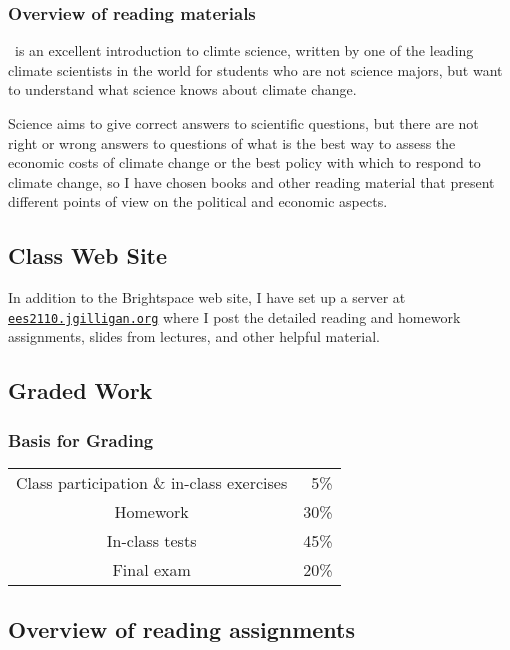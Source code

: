 \documentclass[11pt]{jgsyllabus}\usepackage[]{graphicx}\usepackage[]{xcolor}
\begin{document}
\subsubsection{Overview of reading materials}
\MedArcher\ is an excellent introduction to
climte science, written by one of the leading climate scientists in the world
for students who are not science majors, but want to understand what science
knows about climate change.

Science aims to give correct answers to scientific questions, but there are
not right or wrong answers to questions of what is the best way to
assess the economic costs of climate change or the best policy with which to
respond to climate change, so I have chosen books and other reading material
that present different points of view on the political and economic aspects.

\subsection{Class Web Site}

In addition to the Brightspace web site, I have set up a server at
\href{https://ees2110.jgilligan.org}{\nolinkurl{ees2110.jgilligan.org}}
where I post the detailed reading and homework assignments,
slides from lectures, and other helpful material.


\subsection{Graded Work}
%
%
%
\subsubsection[Grading]{Basis for Grading}

\begin{center}
	\begin{tabular}[t]{cr}
		Class participation \& in-class exercises & 5\%\\
		Homework & 30\%\\
		In-class tests & 45\%\\
		Final exam   & 20\%\\
	\end{tabular}
\end{center}
%
%
%
%
\subsection{Overview of reading assignments}
\end{document}
